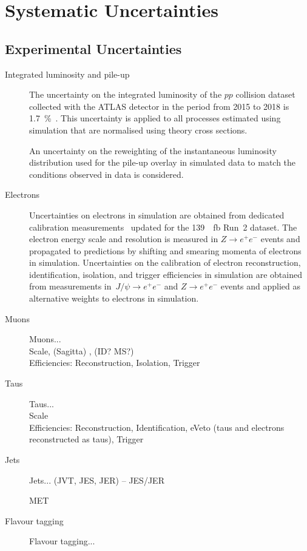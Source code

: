 \section{Systematic Uncertainties}
\label{sec:uncertainties}

\subsection{Experimental Uncertainties}


\begin{description}
\item[Integrated luminosity and pile-up] The uncertainty on the
  integrated luminosity of the $pp$ collision dataset collected with
  the ATLAS detector in the period from 2015 to 2018 is
  \SI{1.7}{\percent}~\cite{ATLAS-CONF-2019-021}. This uncertainty is
  applied to all processes estimated using simulation that are
  normalised using theory cross sections.

  An uncertainty on the reweighting of the instantaneous luminosity
  distribution used for the pile-up overlay in simulated data to match
  the conditions observed in data is considered.

\item[Electrons] Uncertainties on electrons in simulation are obtained
  from dedicated calibration
  measurements~\cite{EGAM-2018-01,TRIG-2018-05} updated for the
  \SI{139}{\per\femto\barn} Run~2 dataset. The electron energy scale
  and resolution is measured in $Z \to e^+e^-$ events and propagated
  to predictions by shifting and smearing momenta of electrons in
  simulation. Uncertainties on the calibration of electron
  reconstruction, identification, isolation, and trigger efficiencies
  in simulation are obtained from measurements in~$J/\psi \to e^+e^-$
  and $Z \to e^+e^-$ events and applied as alternative weights to
  electrons in simulation.

\item[Muons]
  Muons... \cite{MUON-2018-03} \\
  Scale, (Sagitta) , (ID? MS?) \\
  Efficiencies: Reconstruction, Isolation, Trigger

\item[Taus]
  Taus... \\
  Scale \\
  Efficiencies: Reconstruction, Identification, eVeto (taus and
  electrons reconstructed as taus), Trigger

\item[Jets] Jets... (JVT, JES, JER) -- JES/JER \cite{JETM-2018-05}

\item[\pTmissAbs] MET

\item[Flavour tagging] Flavour tagging... \cite{FTAG-2018-01}

\end{description}

